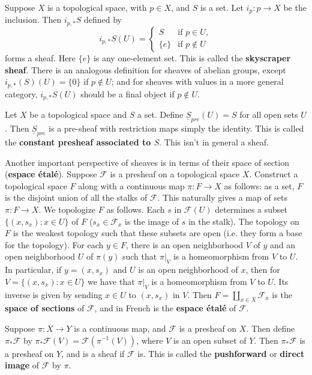 \begin{example}
    Suppose $X$ is a topological space, with $p \in X$, and $S$ is a set. Let $i_p:p\rightarrow X$ be the inclusion. Then $i_{p,*}S$ defined by $$i_{p,*}S(U) = \left\{\begin{array}{lc} S & \text{if } p \in U, \\ \{e\}&\text{if }p \notin U\end{array}\right.$$
    forms a sheaf. Here $\{e\}$ is any one-element set. This is called the \textbf{skyscraper sheaf}. There is an analogous definition for sheaves of abelian groups, except $i_{p,*}(S)(U) = \{0\}$ if $p \notin U$; and for sheaves with values in a more general category, $i_{p,*}S(U)$ should be a final object if $p \notin U$.
\end{example}

\begin{example}
    Let $X$ be a topological space and $S$ a set. Define $\underline{S}_{pre}(U) = S$ for all open sets $U$. Then $\underline{S}_{pre}$ is a pre-sheaf with restriction maps simply the identity. This is called the \textbf{constant presheaf associated to $S$}. This isn't in general a sheaf.
\end{example}

Another important perspective of sheaves is in terms of their space of section (\textbf{espace \'{e}tal\'{e}}). Suppose $\mathscr{F}$ is a presheaf on a topological space $X$. Construct a topological space $F$ along with a continuous map $\pi:F\rightarrow X$ as follows: as a set, $F$ is the disjoint union of all the stalks of $\mathscr{F}$. This naturally gives a map of sets $\pi:F\rightarrow X$. We topologize $F$ as follows. Each $s$ in $\mathscr{F}(U)$ determines a subset $\{(x,s_x):x \in U\}$ of $F$ ($s_x \in \mathscr{F}_x$ is the image of $s$ in the stalk). The topology on $F$ is the weakest topology such that these subsets are open (i.e. they form a base for the topology). For each $y \in F$, there is an open neighborhood $V$ of $y$ and an open neighborhood $U$ of $\pi(y)$ such that $\pi\vert_V$ is a homeomorphism from $V$ to $U$. In particular, if $y = (x,s_x)$ and $U$ is an open neighborhood of $x$, then for $V = \{(x,s_x):x \in U\}$ we have that $\pi\vert_V$ is a homeomorphism from $V$ to $U$. Its inverse is given by sending $x \in U$ to $(x,s_x)$ in $V$. Then $F = \amalg_{x \in X}\mathscr{F}_x$ is the \textbf{space of sections} of $\mathscr{F}$, and in French is the \textbf{espace \'{e}tal\'{e}} of $\mathscr{F}$.

\begin{definition}
    Suppose $\pi:X\rightarrow Y$ is a continuous map, and $\mathscr{F}$ is a presheaf on $X$. Then define $\pi_*\mathscr{F}$ by $\pi_*\mathscr{F}(V) = \mathscr{F}(\pi^{-1}(V))$, where $V$ is an open subset of $Y$. Then $\pi_*\mathscr{F}$ is a presheaf on $Y$, and is a sheaf if $\mathscr{F}$ is. This is called the \textbf{pushforward} or \textbf{direct image} of $\mathscr{F}$ by $\pi$.
\end{definition}
 
